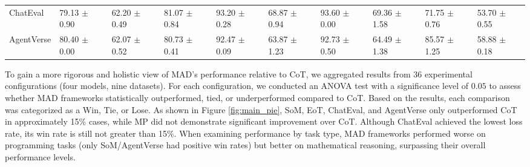 \begin{table*}[tbp]
{\begin{tabular}{l|lllllllll}
ChatEval & \cellcolor{LightBlue}79.13 $\pm$ 0.90 & \cellcolor{LightBlue}62.20 $\pm$ 0.49 & \cellcolor{LightBlue}81.07 $\pm$ 0.84 & \cellcolor{LightBlue}93.20 $\pm$ 0.28 & \cellcolor{LightRed}68.87 $\pm$ 0.94 & 93.60 $\pm$ 0.00 & \cellcolor{LightBlue}69.36 $\pm$ 1.58 & \cellcolor{LightBlue}71.75 $\pm$ 0.76 & \cellcolor{LightBlue}53.70 $\pm$ 0.55 \\
AgentVerse & \cellcolor{LightBlue}80.40 $\pm$ 0.00 & \cellcolor{LightBlue}62.07 $\pm$ 0.52 & \cellcolor{LightBlue}80.73 $\pm$ 0.41 & \cellcolor{LightBlue}92.47 $\pm$ 0.09 & \cellcolor{LightBlue}63.87 $\pm$ 1.23 & \cellcolor{LightBlue}92.73 $\pm$ 0.50 & \cellcolor{LightBlue}64.49 $\pm$ 1.38 & \cellcolor{LightRed}85.57 $\pm$ 1.25 & \cellcolor{LightBlue}58.88 $\pm$ 0.18 \\
\hline
\end{tabular}}
\end{table*}

To gain a more rigorous and holistic view of MAD's performance relative to CoT, we aggregated results from 36 experimental configurations (four models, nine datasets). For each configuration, we conducted an ANOVA test with a significance level of $0.05$ to assess whether MAD frameworks statistically outperformed, tied, or underperformed compared to CoT. Based on the results, each comparison was categorized as a Win, Tie, or Lose. As shown in Figure \ref{fig:main_pie}, SoM, EoT, ChatEval, and AgentVerse only outperformed CoT in approximately 15\% cases, while MP did not demonstrate significant improvement over CoT. Although ChatEval achieved the lowest loss rate, its win rate is still not greater than 15\%. 
When examining performance by task type, MAD frameworks performed worse on programming tasks (only SoM/AgentVerse had positive win rates) but better on mathematical reasoning, surpassing their overall performance levels.


